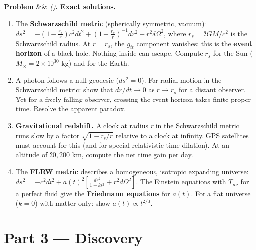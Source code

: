 \documentclass[12pt,a4paper]{article}
\newcounter{problem}
\newenvironment{problem}[1][]{\refstepcounter{problem}\par\vspace{6pt}\noindent\textbf{\color{MidBlue}Problem \theproblem}\ifx&#1&\else\ \textit{(#1)}\fi\textbf{.}\enskip}{\par\vspace{4pt}}
\begin{document}
\begin{problem}
\label{prob:gr_solutions}
\textbf{Exact solutions.}
\begin{enumerate}[label=(\alph*),topsep=2pt]
  \item The \textbf{Schwarzschild metric} (spherically symmetric, vacuum):
  $ds^2 = -\left(1-\frac{r_s}{r}\right)c^2dt^2 + \left(1-\frac{r_s}{r}\right)^{-1}dr^2 + r^2d\Omega^2$,
  where $r_s = 2GM/c^2$ is the Schwarzschild radius. At $r=r_s$, the $g_{tt}$ component vanishes: this is the \textbf{event horizon} of a black hole. Nothing inside can escape. Compute $r_s$ for the Sun ($M_\odot=2\times 10^{30}$ kg) and for the Earth.
  \item A photon follows a null geodesic ($ds^2=0$). For radial motion in the Schwarzschild metric: show that $dr/dt\to 0$ as $r\to r_s$ for a distant observer. Yet for a freely falling observer, crossing the event horizon takes finite proper time. Resolve the apparent paradox.
  \item \textbf{Gravitational redshift.} A clock at radius $r$ in the Schwarzschild metric runs slow by a factor $\sqrt{1-r_s/r}$ relative to a clock at infinity. GPS satellites must account for this (and for special-relativistic time dilation). At an altitude of $20{,}200$ km, compute the net time gain per day.
  \item The \textbf{FLRW metric} describes a homogeneous, isotropic expanding universe: $ds^2 = -c^2dt^2+a(t)^2\left[\frac{dr^2}{1-kr^2}+r^2d\Omega^2\right]$. The Einstein equations with $T_{\mu\nu}$ for a perfect fluid give the \textbf{Friedmann equations} for $a(t)$. For a flat universe ($k=0$) with matter only: show $a(t)\propto t^{2/3}$.
\end{enumerate}
\end{problem}

\section{Part 3 \texorpdfstring{---}{--} Discovery}
\end{document}
